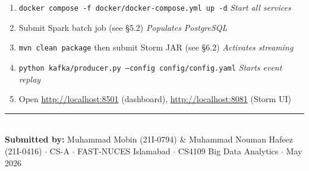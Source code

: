 \documentclass[12pt,a4paper]{article}
\begin{document}
\begin{infobox}
\begin{enumerate}[leftmargin=1.4em, noitemsep]
  \item \texttt{docker compose -f docker/docker-compose.yml up -d} \hfill\textit{Start all services}
  \item Submit Spark batch job (see §5.2) \hfill\textit{Populates PostgreSQL}
  \item \texttt{mvn clean package} then submit Storm JAR (see §6.2) \hfill\textit{Activates streaming}
  \item \texttt{python kafka/producer.py --config config/config.yaml} \hfill\textit{Starts event replay}
  \item Open \url{http://localhost:8501} (dashboard), \url{http://localhost:8081} (Storm UI)
\end{enumerate}
\end{infobox}

\vfill
\noindent\rule{\textwidth}{0.5pt}\\
{\small \textbf{Submitted by:} Muhammad Mobin (21I-0794) \& Muhammad Nouman Hafeez (21I-0416) $\cdot$ CS-A $\cdot$ FAST-NUCES Islamabad $\cdot$ CS4109 Big Data Analytics $\cdot$ May 2026}
\end{document}
